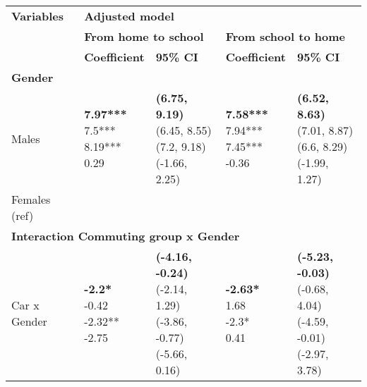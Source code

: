 
      \begin{table}
      \begin{center}
      \begin{small}
      \begin{tabular}{lllll}
      \toprule
        \textbf{Variables}
          & \multicolumn{4}{l}{\textbf{Adjusted model}} \\ \cline{2-5}
        & \multicolumn{2}{l}{\textbf{From home to school}} 
          & \multicolumn{2}{l}{\textbf{From school to home}} \\ \cline{2-3} \cline{4-5}
        & \textbf{Coefficient} & \textbf{95\% CI} & \textbf{Coefficient} & \textbf{95\% CI} \\
      \midrule
    \textbf{Gender} & & & & \\ 
\quad Males    &  \makecell[l]{\textbf{7.97***} \\7.5*** \\8.19*** \\0.29 \\}   &  \makecell[l]{\textbf{(6.75, 9.19)} \\(6.45, 8.55) \\(7.2, 9.18) \\(-1.66, 2.25) \\}   &  \makecell[l]{\textbf{7.58***} \\7.94*** \\7.45*** \\-0.36 \\}   &  \makecell[l]{\textbf{(6.52, 8.63)} \\(7.01, 8.87) \\(6.6, 8.29) \\(-1.99, 1.27) \\} \\ 
\quad Females (ref) & & & & \\ 
\multicolumn{5}{l}{\textbf{Interaction Commuting group x Gender}} \\ 
\quad Car x Gender    &  \makecell[l]{\textbf{-2.2*} \\-0.42 \\-2.32** \\-2.75 \\}   &  \makecell[l]{\textbf{(-4.16, -0.24)} \\(-2.14, 1.29) \\(-3.86, -0.77) \\(-5.66, 0.16) \\}   &  \makecell[l]{\textbf{-2.63*} \\1.68 \\-2.3* \\0.41 \\}   &  \makecell[l]{\textbf{(-5.23, -0.03)} \\(-0.68, 4.04) \\(-4.59, -0.01) \\(-2.97, 3.78) \\} \\ 

\end{tabular}
\end{small}
\end{center}
\end{table}
